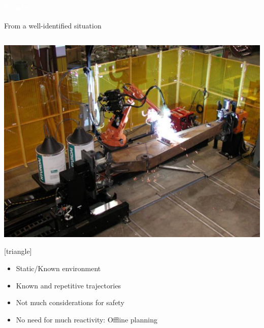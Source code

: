 \begin{frame}
  \frametitle{{\textcolor{white}{\hspace{0.3cm}Context}}}



From a well-identified situation 
\begin{columns}

                \column{.47\paperwidth}
                \begin{center}
                
                        \includegraphics[width=\textwidth ]{figures/well_df_sit.pdf}
                        
[triangle]                        
\begin{itemize}
\item Static/Known environment 
\item Known and repetitive trajectories 
\item Not much considerations for safety 
\item[\hookrightarrow] No need for much reactivity: Offline planning
\end{itemize}
                        
                        
                        \end{center}

                \column{.47\paperwidth}

\end{columns}

\end{frame}




